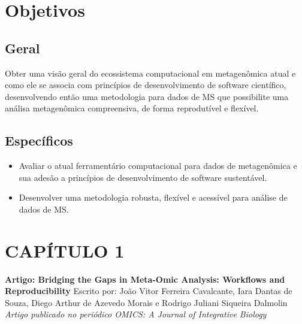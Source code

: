 \documentclass[
	12pt,				%
	oneside,			%
	a4paper,			%
	chapter=TITLE,		%
	section=TITLE,		%
	english,			%
	brazil				%
	]{abntex2}
\begin{document}
\chapter{Objetivos}\label{obj}

\section{Geral}\label{geral}

Obter uma visão geral do ecossistema computacional em metagenômica atual e como ele se associa
com princípios de desenvolvimento de software científico, desenvolvendo então uma metodologia
para dados de \gls{MS} que possibilite uma análisa metagenômica compreensiva, de forma reprodutível e flexível.

\section{Específicos}\label{especuxedficos}
\begin{itemize}
\tightlist
\item
  Avaliar o atual ferramentário computacional para dados de metagenômica e sua adesão a princípios de desenvolvimento de software sustentável.
\item
  Desenvolver uma metodologia robusta, flexível e acessível para análise de dados de \gls{MS}.
\end{itemize}
\chapter*{CAPÍTULO 1}\label{cap1}
\begin{center}
\textbf{Artigo: Bridging the Gaps in Meta-Omic Analysis: Workflows and Reproducibility}
\bigskip\newline
Escrito por: João Vitor Ferreira Cavalcante, Iara Dantas de Souza, Diego Arthur de Azevedo Morais e Rodrigo Juliani Siqueira Dalmolin
\bigskip\newline
\textit{Artigo publicado no periódico OMICS: A Journal of Integrative Biology}

\end{center}
\begin{fichacatalografica}
    
\end{fichacatalografica}
\end{document}
